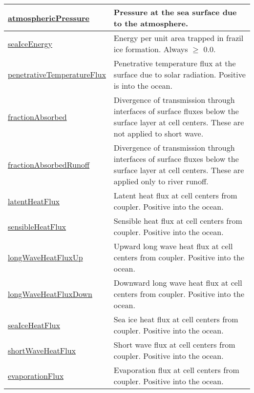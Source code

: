 {\begin{center}
\begin{longtable}{| p{2.0in} | p{4.0in} |}
    \hline
    \hyperref[subsec:var_sec_forcing_atmosphericPressure]{atmosphericPressure} & Pressure at the sea surface due to the atmosphere. \\
    \hline
    \hyperref[subsec:var_sec_forcing_seaIceEnergy]{seaIceEnergy} & Energy per unit area trapped in frazil ice formation. Always $\ge$ 0.0. \\
    \hline
    \hyperref[subsec:var_sec_forcing_penetrativeTemperatureFlux]{penetrativeTemperatureFlux} & Penetrative temperature flux at the surface due to solar radiation. Positive is into the ocean. \\
    \hline
    \hyperref[subsec:var_sec_forcing_fractionAbsorbed]{fractionAbsorbed} & Divergence of transmission through interfaces of surface fluxes below the surface layer at cell centers. These are not applied to short wave. \\
    \hline
    \hyperref[subsec:var_sec_forcing_fractionAbsorbedRunoff]{fractionAbsorbedRunoff} & Divergence of transmission through interfaces of surface fluxes below the surface layer at cell centers. These are applied only to river runoff. \\
    \hline
    \hyperref[subsec:var_sec_forcing_latentHeatFlux]{latentHeatFlux} & Latent heat flux at cell centers from coupler. Positive into the ocean. \\
    \hline
    \hyperref[subsec:var_sec_forcing_sensibleHeatFlux]{sensibleHeatFlux} & Sensible heat flux at cell centers from coupler. Positive into the ocean. \\
    \hline
    \hyperref[subsec:var_sec_forcing_longWaveHeatFluxUp]{longWaveHeatFluxUp} & Upward long wave heat flux at cell centers from coupler. Positive into the ocean. \\
    \hline
    \hyperref[subsec:var_sec_forcing_longWaveHeatFluxDown]{longWaveHeatFluxDown} & Downward long wave heat flux at cell centers from coupler. Positive into the ocean. \\
    \hline
    \hyperref[subsec:var_sec_forcing_seaIceHeatFlux]{seaIceHeatFlux} & Sea ice heat flux at cell centers from coupler. Positive into the ocean. \\
    \hline
    \hyperref[subsec:var_sec_forcing_shortWaveHeatFlux]{shortWaveHeatFlux} & Short wave flux at cell centers from coupler. Positive into the ocean. \\
    \hline
    \hyperref[subsec:var_sec_forcing_evaporationFlux]{evaporationFlux} & Evaporation flux at cell centers from coupler. Positive into the ocean. \\

\end{longtable}
\end{center}}
